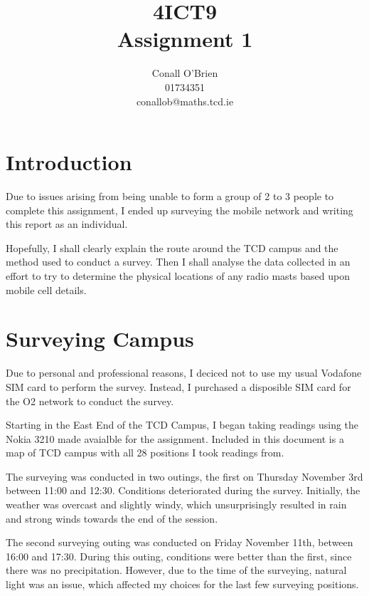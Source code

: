 \documentclass[a4paper,12pt]{article}
\begin{document}


\title{4ICT9 \\ Assignment 1}

\author{Conall O'Brien \\ 01734351 \\ conallob@maths.tcd.ie}

\maketitle

\section{Introduction}

Due to issues arising from being unable to form a group of 2 to 3 people to complete
this assignment, I ended up surveying the mobile network and writing
this report as an individual.


Hopefully, I shall clearly explain the route around the TCD campus and
the method used to conduct a survey. Then I shall analyse the data
collected in an effort to try to determine the physical locations of any
radio masts based upon mobile cell details.

\section{Surveying Campus}

Due to personal and professional reasons, I deciced not to use my usual
Vodafone SIM card to perform the survey. Instead, I purchased a
disposible SIM card for the O2 network to conduct the survey.


Starting in the East End of the TCD Campus, I began taking readings
using the Nokia 3210 made avaialble for the assignment. Included in this
document is a map of TCD campus with all 28 positions I took readings from.


The surveying was conducted in two outings, the first on Thursday
November 3rd between 11:00 and 12:30. Conditions deteriorated during the
survey. Initially, the weather was overcast and slightly windy, which
unsurprisingly resulted in rain and strong winds towards the end of the
session.


The second surveying outing was conducted on Friday November 11th,
between 16:00 and 17:30. During this outing, conditions were better than
the first, since there was no precipitation. However, due to the time of
the surveying, natural light was an issue, which affected my choices for
the last few surveying positions.
\end{document}
